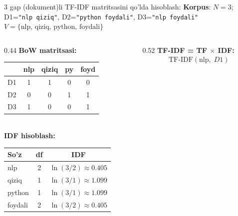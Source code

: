 \documentclass[aspectratio=169,11pt]{beamer}
\begin{document}
%
%
\begin{frame}{3 gap (dokument)li TF-IDF matritsasini qo'lda hisoblash:}
  \textbf{Korpus}: $N=3$;\quad
  D1=\texttt{"nlp qiziq"},\; D2=\texttt{"python foydali"},\; D3=\texttt{"nlp foydali"}\\
  $V=\{\text{nlp, qiziq, python, foydali}\}$
  \vspace{4pt}
  \begin{columns}[T]
    \begin{column}{0.44\textwidth}
      \small\textbf{BoW matritsasi:}\\[3pt]
      \begin{tabular}{lcccc}
        \toprule
         & nlp & qiziq & py & foyd \\
        \midrule
        D1 & 1 & 1 & 0 & 0 \\
        D2 & 0 & 0 & 1 & 1 \\
        D3 & 1 & 0 & 0 & 1 \\
        \bottomrule
      \end{tabular}\\[6pt]
      \small\textbf{IDF hisoblash:}\\[3pt]
      \begin{tabular}{lcc}
        \toprule
        So'z & df & IDF \\
        \midrule
        nlp     & 2 & $\ln(3/2)\approx\mathbf{0.405}$ \\
        qiziq   & 1 & $\ln(3/1)\approx\mathbf{1.099}$ \\
        python  & 1 & $\ln(3/1)\approx 1.099$ \\
        foydali & 2 & $\ln(3/2)\approx 0.405$ \\
        \bottomrule
      \end{tabular}
    \end{column}
    \begin{column}{0.52\textwidth}
      \small\textbf{TF-IDF = TF $\times$ IDF:}\\[4pt]
      \begin{align*}
        \mathrm{TF\text{-}IDF}(\text{nlp},\; D1)

\end{align*}
\end{column}
\end{columns}
\end{frame}
\end{document}
